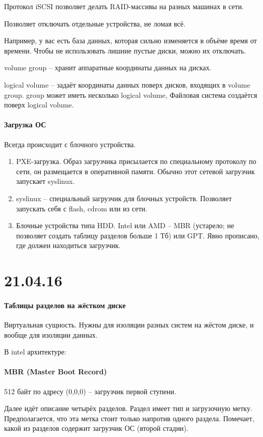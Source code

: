 \documentclass[a4paper,10pt]{article}
\begin{document}
Протокол iSCSI позволяет делать RAID-массивы на разных машинах в сети.

Позволяет отключать отдельные устройства, не ломая всё.

Например, у вас есть база данных, которая сильно изменяется в объёме время от времени. Чтобы не использовать лишние пустые диски, можно их отключать.

volume group -- хранит аппаратные координаты данных на дисках.

logical volume -- задаёт координаты данных поверх дисков, входящих в volume group. group может иметь несколько logical volume, Файловая система создаётся поверх logical volume.

\paragraph{Загрузка ОС}
Всегда происходит с блочного устройства. 
\begin{enumerate}
\item PXE-загрузка. Образ загрузчика присылается по специальному протоколу по сети, он размещается в оперативной памяти. Обычно этот сетевой загрузчик запускает syslinux.
\item syslinux -- специальный загрузчик для блочных устройств.
Позволяет запускать себя с flash, cdrom или из сети.
\item Блочные устройства типа HDD. Intel или AMD  -- MBR (устарело; не позволяет создать таблицу разделов больше 1 Тб) или GPT. Явно прописано, где должен находиться загрузчик. 
\end{enumerate}

\section{21.04.16}
\paragraph{Таблицы разделов на жёстком диске}
Виртуальная сущность. Нужны для изоляции разных систем на жёстом диске, и вообще для изоляции данных.

В intel архитектуре:

\paragraph{MBR (Master Boot Record)}
512 байт по адресу (0,0,0)  -- загрузчик первой ступени.

Далее идёт описание четырёх разделов. Раздел имеет тип и загрузочную метку. Предполагается, что эта метка стоит только напротив одного раздела. Помечает, какой из разделов содержит загрузчик ОС (второй стадии).
\end{document}
